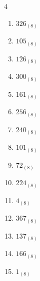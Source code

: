 \begin{multicols}{4}
\begin{enumerate}
\columnbreak %

  \item $326_{(8)}$

        \phantom{$=214$}

  \item $105_{(8)}$

        \phantom{$=69$}

  \item $126_{(8)}$

        \phantom{$=86$}

  \item $300_{(8)}$

        \phantom{$=192$}

  \item $161_{(8)}$

        \phantom{$=113$}

  \item $256_{(8)}$

        \phantom{$=174$}

  \item $240_{(8)}$

        \phantom{$=160$}

  \item $101_{(8)}$

        \phantom{$=65$}

  \item $72_{(8)}$

        \phantom{$=58$}

  \item $224_{(8)}$

        \phantom{$=148$}

  \item $4_{(8)}$

        \phantom{$=4$}

  \item $367_{(8)}$

        \phantom{$=247$}

  \item $137_{(8)}$

        \phantom{$=95$}

  \item $166_{(8)}$

        \phantom{$=118$}

  \item $1_{(8)}$

        \phantom{$=1$}

\columnbreak %


\end{enumerate}
\end{multicols}
